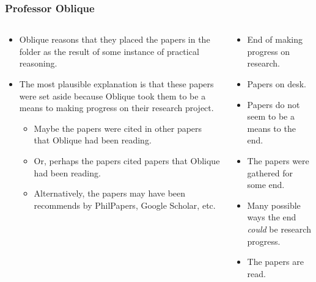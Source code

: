 \documentclass[noamssymb, compress, handout]{beamer} %
\begin{document}
\begin{frame}
  \frametitle{Professor Oblique}

  \begin{columns}[c]
    \begin{column}{0.6\textwidth}
      {\addtolength{\leftmargini}{-2\labelsep}
      \begin{itemize}
      \item<1-> Oblique reasons that they placed the papers in the folder as the result of some instance of practical reasoning.
      \item<2-> The most plausible explanation is that these papers were set aside because Oblique took them to be a means to making progress on their research project.
        \begin{itemize}
        \item<3-> Maybe the papers were cited in other papers that Oblique had been reading.
        \item<3-> Or, perhaps the papers cited papers that Oblique had been reading.
        \item<3-> Alternatively, the papers may have been recommends by PhilPapers, Google Scholar, etc.
        \end{itemize}
      \end{itemize}
    }
  \end{column}
  \vrule{}
  \begin{column}{0.3\textwidth}
    {
      \footnotesize
      \begin{itemize}
      \item End of making progress on research.
      \item Papers on desk.
      \item Papers do not seem to be a means to the end.
      \item The papers were gathered for some end.
      \item<3-> Many possible ways the end \emph{could} be research progress.
      \item[] {\color{white} The papers are read.}
      \end{itemize}
    }
  \end{column}
\end{columns}

\end{frame}
\end{document}
